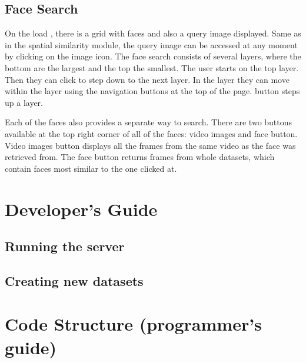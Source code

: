 \section{Face Search}

On the load , there is a grid with faces and also a query image displayed. Same as in the spatial similarity module, the query image can be accessed at any moment by clicking on the image icon. The face search consists of several layers, where the bottom are the largest and the top the smallest. The user starts on the top layer. Then they can click to step down to the next layer. In the layer they can move within the layer using the navigation buttons at the top of the page.  button steps up a layer.

Each of the faces also provides a separate way to search. There are two buttons available at the top right corner of all of the faces: video images and face button. Video images button displays all the frames from the same video as the face was retrieved from. The face button returns frames from whole datasets, which contain faces most similar to the one clicked at.

\chapter{Developer's Guide}
\label{ch:developers_guide}

\cite{pedregosa2011scikit}
\cite{van2011numpy}

\section{Running the server}

\section{Creating new datasets}



\chapter{Code Structure (programmer's guide)}
\label{ch:programmers_guide}


